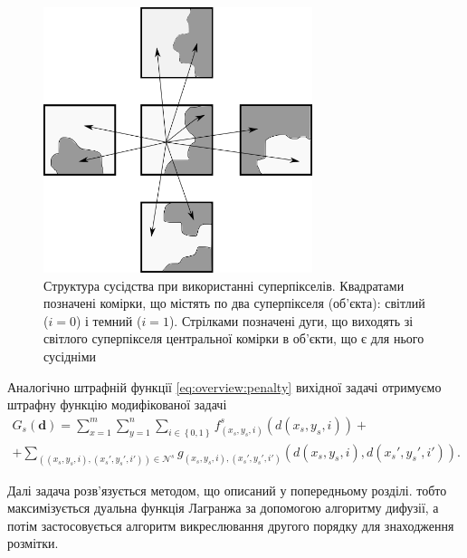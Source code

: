 \begin{figure}[h]
  \centering
  \includegraphics[width=0.7\textwidth]{images/neighbours_superpixel}
  \caption{Структура сусідства при використанні суперпікселів.
           Квадратами позначені комірки,
           що містять по два суперпікселя (об'єкта):
           світлий ($i = 0$) і темний ($i = 1$).
           Стрілками позначені дуги,
           що виходять зі світлого суперпікселя центральної комірки в об'єкти,
           що є для нього сусідніми}
  \label{fig:superpixel:neighbors}
\end{figure}

Аналогічно штрафній функції \eqref{eq:overview:penalty}
вихідної задачі отримуємо штрафну функцію модифікованої задачі
\begin{equation*}
\begin{gathered}
    G_s \left( \pmb{d} \right)
    = \sum \limits_{x = 1}^{m}
        \sum \limits_{y = 1}^{n}
            \sum \limits_{i \in \left\{ 0, 1 \right\}}
                f_{\left( x_s, y_s, i \right)}^s
                    \left( d \left(x_s, y_s, i \right) \right) + \\
    + \sum \limits_{\left( \left(x_s, y_s, i \right), \left(x_s', y_s', i' \right) \right) \in \mathcal{N}^s}
            g_{\left(x_s, y_s, i \right), \left(x_s', y_s', i' \right)} \left(
                d \left( x_s, y_s, i \right), d \left( x_s', y_s', i' \right)
            \right).
\end{gathered}
\end{equation*}

Далі задача розв'язується методом, що описаний у попередньому розділі.
тобто максимізується дуальна функція Лагранжа за допомогою алгоритму дифузії,
а потім застосовується алгоритм викреслювання другого порядку для знаходження розмітки.

